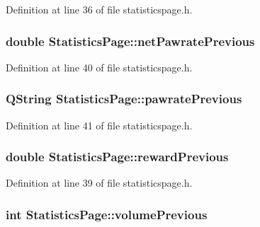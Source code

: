 Definition at line 36 of file statisticspage.\+h.

\hypertarget{class_statistics_page_ab8a85b1fd310e654847b9adf8f0c6048}{}
\subsubsection[{net\+Pawrate\+Previous}]{\setlength{\rightskip}{0pt plus 5cm}double Statistics\+Page\+::net\+Pawrate\+Previous}\label{class_statistics_page_ab8a85b1fd310e654847b9adf8f0c6048}


Definition at line 40 of file statisticspage.\+h.

\hypertarget{class_statistics_page_a7edfdc7c8b7a0162ce9d13b147f4dea4}{}
\subsubsection[{pawrate\+Previous}]{\setlength{\rightskip}{0pt plus 5cm}Q\+String Statistics\+Page\+::pawrate\+Previous}\label{class_statistics_page_a7edfdc7c8b7a0162ce9d13b147f4dea4}


Definition at line 41 of file statisticspage.\+h.

\hypertarget{class_statistics_page_af1cd42e34f124ef0c6db81498bdee183}{}
\subsubsection[{reward\+Previous}]{\setlength{\rightskip}{0pt plus 5cm}double Statistics\+Page\+::reward\+Previous}\label{class_statistics_page_af1cd42e34f124ef0c6db81498bdee183}


Definition at line 39 of file statisticspage.\+h.

\hypertarget{class_statistics_page_a177fce18a55c633a67492ecc116e5766}{}
\subsubsection[{volume\+Previous}]{\setlength{\rightskip}{0pt plus 5cm}int Statistics\+Page\+::volume\+Previous}\label{class_statistics_page_a177fce18a55c633a67492ecc116e5766}



